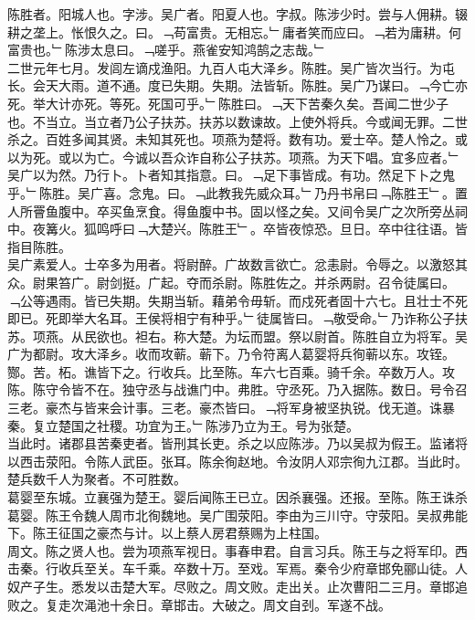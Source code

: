 \documentclass{zhvt-classic}
\begin{document}

\hspace*{2em}陈胜者。阳城人也。字涉。吴广者。阳夏人也。字叔。陈涉少时。尝与人佣耕。辍耕之垄上。怅恨久之。曰。﹁苟富贵。无相忘。﹂庸者笑而应曰。﹁若为庸耕。何富贵也。﹂陈涉太息曰。﹁嗟乎。燕雀安知鸿鹄之志哉。﹂\\
\hspace*{2em}二世元年七月。发闾左谪戍渔阳。九百人屯大泽乡。陈胜。吴广皆次当行。为屯长。会天大雨。道不通。度已失期。失期。法皆斩。陈胜。吴广乃谋曰。﹁今亡亦死。举大计亦死。等死。死国可乎。﹂陈胜曰。﹁天下苦秦久矣。吾闻二世少子也。不当立。当立者乃公子扶苏。扶苏以数谏故。上使外将兵。今或闻无罪。二世杀之。百姓多闻其贤。未知其死也。项燕为楚将。数有功。爱士卒。楚人怜之。或以为死。或以为亡。今诚以吾众诈自称公子扶苏。项燕。为天下唱。宜多应者。﹂吴广以为然。乃行卜。卜者知其指意。曰。﹁足下事皆成。有功。然足下卜之鬼乎。﹂陈胜。吴广喜。念鬼。曰。﹁此教我先威众耳。﹂乃丹书帛曰﹁陈胜王﹂。置人所罾鱼腹中。卒买鱼烹食。得鱼腹中书。固以怪之矣。又间令吴广之次所旁丛祠中。夜篝火。狐鸣呼曰﹁大楚兴。陈胜王﹂。卒皆夜惊恐。旦日。卒中往往语。皆指目陈胜。\\
\hspace*{2em}吴广素爱人。士卒多为用者。将尉醉。广故数言欲亡。忿恚尉。令辱之。以激怒其众。尉果笞广。尉剑挺。广起。夺而杀尉。陈胜佐之。并杀两尉。召令徒属曰。﹁公等遇雨。皆已失期。失期当斩。藉弟令毋斩。而戍死者固十六七。且壮士不死即已。死即举大名耳。王侯将相宁有种乎。﹂徒属皆曰。﹁敬受命。﹂乃诈称公子扶苏。项燕。从民欲也。袒右。称大楚。为坛而盟。祭以尉首。陈胜自立为将军。吴广为都尉。攻大泽乡。收而攻蕲。蕲下。乃令符离人葛婴将兵徇蕲以东。攻铚。酂。苦。柘。谯皆下之。行收兵。比至陈。车六七百乘。骑千余。卒数万人。攻陈。陈守令皆不在。独守丞与战谯门中。弗胜。守丞死。乃入据陈。数日。号令召三老。豪杰与皆来会计事。三老。豪杰皆曰。﹁将军身被坚执锐。伐无道。诛暴秦。复立楚国之社稷。功宜为王。﹂陈涉乃立为王。号为张楚。\\
\hspace*{2em}当此时。诸郡县苦秦吏者。皆刑其长吏。杀之以应陈涉。乃以吴叔为假王。监诸将以西击荥阳。令陈人武臣。张耳。陈余徇赵地。令汝阴人邓宗徇九江郡。当此时。楚兵数千人为聚者。不可胜数。\\
\hspace*{2em}葛婴至东城。立襄强为楚王。婴后闻陈王已立。因杀襄强。还报。至陈。陈王诛杀葛婴。陈王令魏人周市北徇魏地。吴广围荥阳。李由为三川守。守荥阳。吴叔弗能下。陈王征国之豪杰与计。以上蔡人房君蔡赐为上柱国。\\
\hspace*{2em}周文。陈之贤人也。尝为项燕军视日。事春申君。自言习兵。陈王与之将军印。西击秦。行收兵至关。车千乘。卒数十万。至戏。军焉。秦令少府章邯免郦山徒。人奴产子生。悉发以击楚大军。尽败之。周文败。走出关。止次曹阳二三月。章邯追败之。复走次渑池十余日。章邯击。大破之。周文自刭。军遂不战。\\
\end{document}
